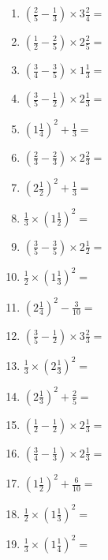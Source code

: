 \documentclass[12pt]{article}
\begin{document}
\begin{enumerate}
\item \large $ \left( \frac{2}{5} - \frac{1}{3} \right) \times 3 \frac{2}{4} = $ \vspace{1.6cm}
\item \large $ \left( \frac{1}{2} - \frac{2}{5} \right) \times 2 \frac{2}{5} = $ \vspace{1.6cm}
\item \large $ \left( \frac{3}{4} - \frac{3}{5} \right) \times 1 \frac{1}{3} = $ \vspace{1.6cm}
\item \large $ \left( \frac{3}{5} - \frac{1}{2} \right) \times 2 \frac{1}{3} = $ \vspace{1.6cm}
\item \large $ \left( 1 \frac{1}{4} \right)^2 + \frac{1}{3} = $ \vspace{1.6cm}
\item \large $ \left( \frac{2}{3} - \frac{2}{3} \right) \times 2 \frac{2}{3} = $ \vspace{1.6cm}
\item \large $ \left( 2 \frac{1}{2} \right)^2 + \frac{1}{3} = $ \vspace{1.6cm}
\item \large $ \frac{1}{3} \times \left( 1 \frac{1}{2} \right)^2 = $ \vspace{1.6cm}
\item \large $ \left( \frac{3}{5} - \frac{3}{5} \right) \times 2 \frac{1}{2} = $ \vspace{1.6cm}
\newpage
\item \large $ \frac{1}{2} \times \left( 1 \frac{1}{3} \right)^2 = $ \vspace{1.6cm}
\item \large $ \left( 2 \frac{1}{4} \right)^2 - \frac{3}{10} = $ \vspace{1.6cm}
\item \large $ \left( \frac{3}{5} - \frac{1}{2} \right) \times 3 \frac{2}{3} = $ \vspace{1.6cm}
\item \large $ \frac{1}{3} \times \left( 2 \frac{1}{3} \right)^2 = $ \vspace{1.6cm}
\item \large $ \left( 2 \frac{1}{3} \right)^2 + \frac{2}{5} = $ \vspace{1.6cm}
\item \large $ \left( \frac{1}{2} - \frac{1}{2} \right) \times 2 \frac{1}{3} = $ \vspace{1.6cm}
\item \large $ \left( \frac{3}{4} - \frac{1}{3} \right) \times 2 \frac{1}{3} = $ \vspace{1.6cm}
\item \large $ \left( 1 \frac{1}{2} \right)^2 + \frac{6}{10} = $ \vspace{1.6cm}
\item \large $ \frac{1}{2} \times \left( 1 \frac{1}{3} \right)^2 = $ \vspace{1.6cm}
\item \large $ \frac{1}{3} \times \left( 1 \frac{1}{4} \right)^2 = $ \vspace{1.6cm}
\end{enumerate}\newpage
\end{document}
